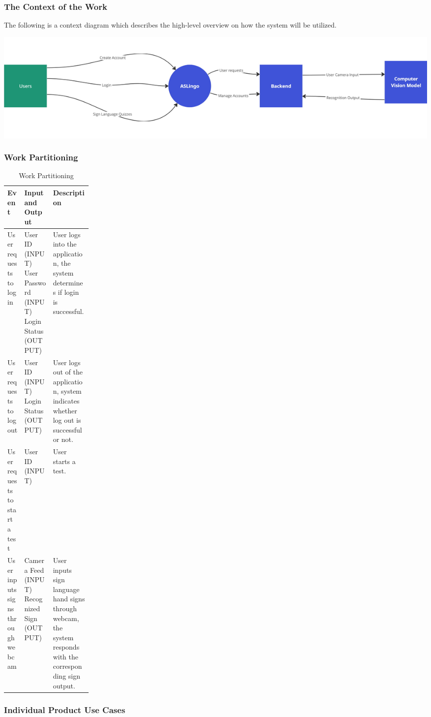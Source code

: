 \documentclass[12pt, titlepage]{article}
\begin{document}
\subsubsection{The Context of the Work}
The following is a context diagram which describes the high-level overview on how the system will be utilized.

\includegraphics[scale=0.25]{context-diagram}

\subsubsection{Work Partitioning}

\begin{table}[H]
  \caption{Work Partitioning}
  \noindent \begin{tabularx}{\textwidth}{|p{0.2\linewidth}|X|X|}
  \hline 
  \textbf{Event} & \textbf{Input and Output} &\textbf{Description}\\
  \hline
  User requests to log in & User ID (INPUT) \newline User Password (INPUT) \newline Login Status (OUTPUT) & User logs into the application, the system determines if login is successful. \\
  \hline
  User requests to log out & User ID (INPUT) \newline Login Status (OUTPUT) & User logs out of the application, system indicates whether log out is successful or not. \\
  \hline
  User requests to start a test & User ID (INPUT) & User starts a test. \\
  \hline
  User inputs signs through webcam & Camera Feed (INPUT) \newline Recognized Sign (OUTPUT) & User inputs sign language hand signs through webcam, the system responds with the corresponding sign output. \\
  \hline
  \end{tabularx}
  \end{table}

\subsubsection{Individual Product Use Cases}
\end{document}
